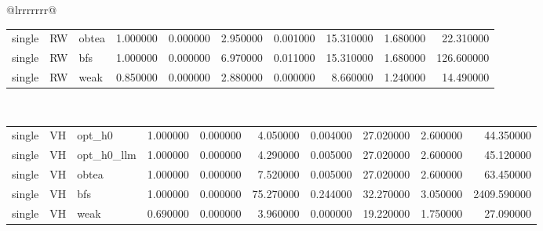 \begin{table}[ht]
\begin{tabular}{@{}lrrrrrrr@{}}
\begin{tabular}{lllrrrrrrr}
single & RW & obtea & 1.000000 & 0.000000 & 2.950000 & 0.001000 & 15.310000 & 1.680000 & 22.310000 \\
single & RW & bfs & 1.000000 & 0.000000 & 6.970000 & 0.011000 & 15.310000 & 1.680000 & 126.600000 \\
single & RW & weak & 0.850000 & 0.000000 & 2.880000 & 0.000000 & 8.660000 & 1.240000 & 14.490000 \\
\bottomrule
\end{tabular}
\midrule
{} \\
\begin{tabular}{lllrrrrrrr}
\toprule
\midrule
single & VH & opt_h0 & 1.000000 & 0.000000 & 4.050000 & 0.004000 & 27.020000 & 2.600000 & 44.350000 \\
single & VH & opt_h0_llm & 1.000000 & 0.000000 & 4.290000 & 0.005000 & 27.020000 & 2.600000 & 45.120000 \\
single & VH & obtea & 1.000000 & 0.000000 & 7.520000 & 0.005000 & 27.020000 & 2.600000 & 63.450000 \\
single & VH & bfs & 1.000000 & 0.000000 & 75.270000 & 0.244000 & 32.270000 & 3.050000 & 2409.590000 \\
single & VH & weak & 0.690000 & 0.000000 & 3.960000 & 0.000000 & 19.220000 & 1.750000 & 27.090000 \\
\bottomrule
\end{tabular}
\midrule
\bottomrule
\end{tabular}
\end{table}
\clearpage
